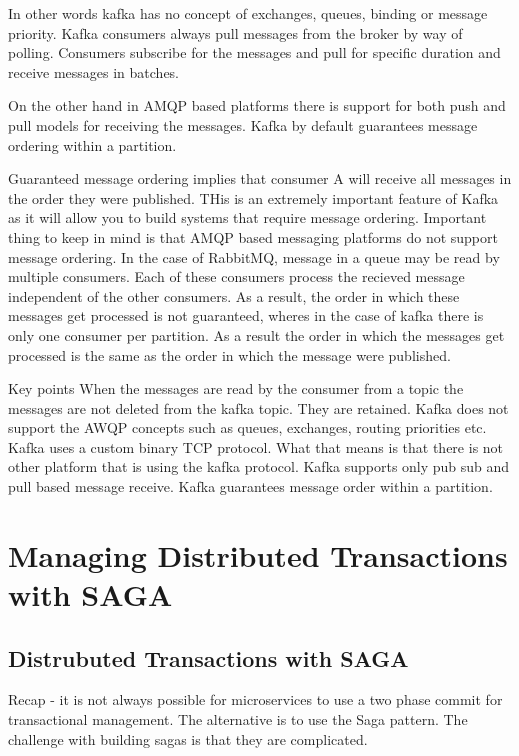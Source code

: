 In other words kafka has no concept of exchanges, queues, binding or message priority.
Kafka consumers always pull messages from the broker by way of polling.
Consumers subscribe for the messages and pull for specific duration and receive messages in batches.

On the other hand in AMQP based platforms there is support for both push and pull models for receiving the messages.
Kafka by default guarantees message ordering within a partition.

Guaranteed message ordering implies that consumer A will receive all messages in the order they were published.
THis is an extremely important feature of Kafka as it will allow you to build systems that require message ordering.
Important thing to  keep in mind is that AMQP based messaging platforms do not support message ordering.
In the case of RabbitMQ, message in a queue may be read by multiple consumers.
Each of these consumers process the recieved message independent of the other consumers.
As a result, the order in which these messages get processed is not guaranteed, wheres in the case of kafka there is only one consumer per partition.
As a result the order in which the messages get processed is the same as the order in which the message were published.

Key points
When the messages are read by the consumer from a topic the messages are not deleted from the kafka topic. They are retained.
Kafka does not support the AWQP concepts such as queues, exchanges, routing priorities etc.
Kafka uses a custom binary TCP protocol.
What that means is that there is not other platform that is using the kafka protocol.
Kafka supports only pub sub and pull based message receive.
Kafka guarantees message order within a partition.


\chapter{Managing Distributed Transactions with SAGA}
\section{Distrubuted Transactions with SAGA}
Recap - it is not always possible for microservices to use a two phase commit for transactional management.
The alternative is to use the Saga pattern.
The challenge with building sagas is that they are complicated.

